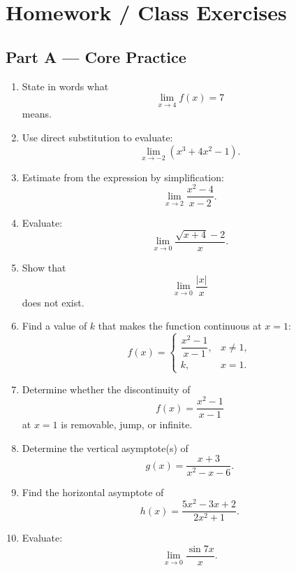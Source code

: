 \documentclass[11pt]{article}
\begin{document}
\section*{Homework / Class Exercises}

\subsection*{Part A --- Core Practice}

\begin{enumerate}
    \item State in words what
    \[
    \lim_{x\to 4}f(x)=7
    \]
    means.

    \item Use direct substitution to evaluate:
    \[
    \lim_{x\to -2}(x^3+4x^2-1).
    \]

    \item Estimate from the expression by simplification:
    \[
    \lim_{x\to 2}\frac{x^2-4}{x-2}.
    \]

    \item Evaluate:
    \[
    \lim_{x\to 0}\frac{\sqrt{x+4}-2}{x}.
    \]

    \item Show that
    \[
    \lim_{x\to 0}\frac{|x|}{x}
    \]
    does not exist.

    \item Find a value of $k$ that makes the function continuous at $x=1$:
    \[
    f(x)=
    \begin{cases}
    \dfrac{x^2-1}{x-1}, & x\neq 1,\\[0.6em]
    k, & x=1.
    \end{cases}
    \]

    \item Determine whether the discontinuity of
    \[
    f(x)=\frac{x^2-1}{x-1}
    \]
    at $x=1$ is removable, jump, or infinite.

    \item Determine the vertical asymptote(s) of
    \[
    g(x)=\frac{x+3}{x^2-x-6}.
    \]

    \item Find the horizontal asymptote of
    \[
    h(x)=\frac{5x^2-3x+2}{2x^2+1}.
    \]

    \item Evaluate:
    \[
    \lim_{x\to 0}\frac{\sin 7x}{x}.
    \]
\end{enumerate}
\end{document}
